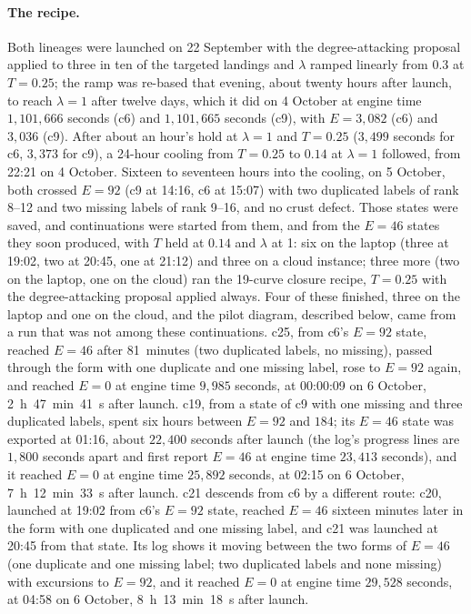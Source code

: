 \documentclass[11pt]{article}
\begin{document}
\paragraph{The recipe.} Both lineages were launched on 22 September with the degree-attacking proposal applied to
three in ten of the targeted landings and $\lambda$ ramped linearly from $0.3$ at $T=0.25$; the ramp was re-based that
evening, about twenty hours after launch, to reach $\lambda=1$ after twelve days, which it did on 4 October at engine time $1{,}101{,}666$ seconds (c6)
and $1{,}101{,}665$ seconds (c9), with $E=3{,}082$ (c6) and $3{,}036$ (c9). After about an hour's hold at $\lambda=1$ and $T=0.25$ ($3{,}499$ seconds for
c6, $3{,}373$ for c9), a 24-hour cooling from $T=0.25$ to $0.14$ at $\lambda=1$ followed, from 22:21 on 4 October.
Sixteen to seventeen hours into the cooling, on 5 October, both crossed $E=92$ (c9 at 14:16, c6 at 15:07) with two duplicated labels of
rank 8--12 and two missing labels of rank 9--16, and no crust defect. Those states were saved, and continuations were
started from them, and from the $E=46$ states they soon produced, with $T$ held at $0.14$ and $\lambda$ at 1: six on
the laptop (three at 19:02, two at 20:45, one at 21:12) and three on a cloud instance; three more (two on the laptop,
one on the cloud) ran the 19-curve closure recipe, $T=0.25$ with the degree-attacking proposal applied always. Four
of these finished, three on the laptop and one on the cloud, and the pilot diagram, described below, came from a run
that was not among these continuations. c25, from c6's $E=92$ state, reached $E=46$ after
81~minutes (two duplicated labels, no missing), passed through the form with one duplicate and one missing label, rose
to $E=92$ again, and reached $E=0$ at engine time $9{,}985$ seconds, at 00:00:09 on 6 October, 2~h~47~min~41~s after launch.
c19, from a state of c9 with one missing and three duplicated labels, spent six hours between $E=92$ and $184$; its
$E=46$ state was exported at 01:16, about $22{,}400$ seconds after launch (the log's progress lines are $1{,}800$ seconds
apart and first report $E=46$ at engine time $23{,}413$ seconds), and it reached $E=0$ at engine time $25{,}892$
seconds, at 02:15 on 6 October, 7~h~12~min~33~s after launch.
c21 descends from c6 by a different route: c20, launched at 19:02 from c6's $E=92$ state, reached $E=46$ sixteen
minutes later in the form with one duplicated and one missing label, and c21 was launched at 20:45 from that state.
Its log shows it moving between the two forms of $E=46$ (one duplicate and one missing label; two duplicated labels and
none missing) with excursions to $E=92$, and it reached $E=0$ at engine time $29{,}528$ seconds, at 04:58 on 6 October,
8~h~13~min~18~s after launch.
\end{document}

